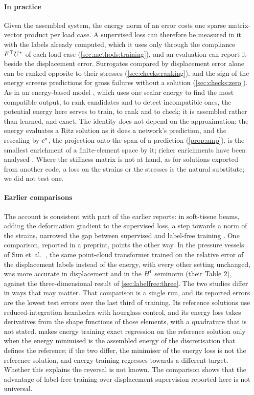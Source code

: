 \paragraph{In practice}
Given the assembled system, the energy norm of an error costs one sparse matrix-vector
product per load case. A supervised loss can therefore be measured in it with the labels
already computed, which it uses only through the compliance $F^{\top}U^{\ast}$ of each load
case (\cref{sec:methods:training}), and an evaluation can report it beside the displacement
error. Surrogates compared by displacement error alone can be ranked opposite to their
stresses (\cref{sec:checks:ranking}), and the sign of the energy screens predictions for
gross failures without a solution (\cref{sec:checks:zero}). As in an energy-based model
\cite{LeCun2007EBM}, which uses one scalar energy to find the most compatible output, to rank
candidates and to detect incompatible ones, the potential energy here serves to train, to
rank and to check; it is assembled rather than learned, and exact. The identity does not
depend on the approximation: the energy evaluates a Ritz solution as it does a network's
prediction, and the rescaling by $c^{\ast}$, the projection onto the span of a prediction
(\cref{prop:amp}), is the smallest enrichment of a finite-element space by it; richer
enrichments have been analysed \cite{Barucq2026Enrich}. Where the stiffness matrix is not at
hand, as for solutions exported from another code, a loss on the strains or the stresses is
the natural substitute; we did not test one.

\paragraph{Earlier comparisons}
The account is consistent with part of the earlier reports: in soft-tissue beams, adding the
deformation gradient to the supervised loss, a step towards a norm of the strains, narrowed
the gap between supervised and label-free training \cite{Dalton2023}. One comparison,
reported in a preprint, points the other way. In the pressure vessels of Sun
et~al.~\cite{Sun2026FEVessel}, the same point-cloud transformer trained on the relative
error of the displacement labels instead of the energy, with every other setting unchanged,
was more accurate in displacement and in the $H^1$ seminorm (their Table 2), against the
three-dimensional result of \cref{sec:labelfree:three}. The two studies differ in ways that
may matter. That comparison is a single run, and its reported errors are the lowest test
errors over the last third of training. Its reference solutions use reduced-integration
hexahedra with hourglass control, and its energy loss takes derivatives from the shape
functions of those elements, with a quadrature that is not stated.  makes
energy training exact regression on the reference solution only when the energy minimised is
the assembled energy of the discretisation that defines the reference; if the two differ,
the minimiser of the energy loss is not the reference solution, and energy training
regresses towards a different target. Whether this explains the reversal is not known. The
comparison shows that the advantage of label-free training over displacement supervision
reported here is not universal.

